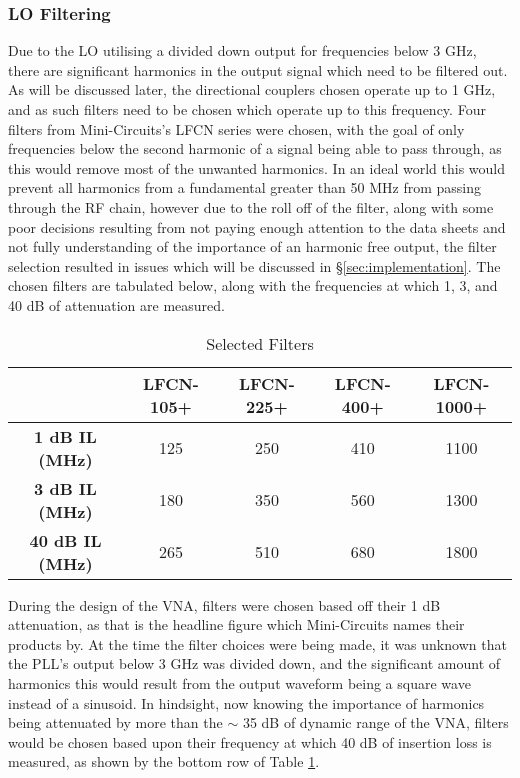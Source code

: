 \subsubsection{LO Filtering}
\label{subsubsec:lo filtering}
Due to the LO utilising a divided down output for frequencies below 3 GHz, there are significant harmonics in the output signal which need to be filtered out. As will be discussed later, the directional couplers chosen operate up to 1 GHz, and as such filters need to be chosen which operate up to this frequency. Four filters from Mini-Circuits's LFCN series were chosen, with the goal of only frequencies below the second harmonic of a signal being able to pass through, as this would remove most of the unwanted harmonics. In an ideal world this would prevent all harmonics from a fundamental greater than 50 MHz from passing through the RF chain,  however due to the roll off of the filter, along with some poor decisions resulting from not paying enough attention to the data sheets and not fully understanding of the importance of an harmonic free output, the filter selection resulted in issues which will be discussed in \S \ref{sec:implementation}. The chosen filters are tabulated below, along with the frequencies at which 1, 3, and 40 dB of attenuation are measured. 

\begin{table}[H]
	\caption{Selected Filters}
	\label{table:selected_filters}
	\centering
	\begin{tabular}{|c|c|c|c|c|}
		\hline
		\textbf{}               & \textbf{LFCN-105+} & \textbf{LFCN-225+} & \textbf{LFCN-400+} & \textbf{LFCN-1000+} \\ \hline
		\textbf{1 dB IL (MHz)}  & 125                & 250                & 410                & 1100                \\ \hline
		\textbf{3 dB IL (MHz)}  & 180                & 350                & 560                & 1300                \\ \hline
		\textbf{40 dB IL (MHz)} & 265                & 510                & 680                & 1800                \\ \hline
	\end{tabular}
\end{table}
\vspace{-1em}
During the design of the VNA, filters were chosen based off their 1 dB attenuation, as that is the headline figure which Mini-Circuits names their products by. At the time the filter choices were being made, it was unknown that the PLL's output below 3 GHz was divided down, and the significant amount of harmonics this would result from the output waveform being a square wave instead of a sinusoid. In hindsight, now knowing the importance of harmonics being attenuated by more than the $\sim$ 35 dB of dynamic range of the VNA, filters would be chosen based upon their frequency at which 40 dB of insertion loss is measured, as shown by the bottom row of Table \ref{table:selected_filters}. 

